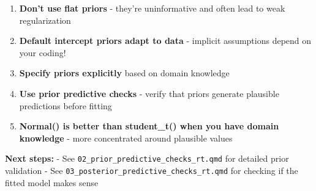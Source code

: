\documentclass[
  11pt,
]{article}
\providecommand{\tightlist}{%
  \setlength{\itemsep}{0pt}\setlength{\parskip}{0pt}}
\begin{document}
\begin{enumerate}
\def\labelenumi{\arabic{enumi}.}
\tightlist
\item
  \textbf{Don't use flat priors} - they're uninformative and often lead
  to weak regularization
\item
  \textbf{Default intercept priors adapt to data} - implicit assumptions
  depend on your coding!
\item
  \textbf{Specify priors explicitly} based on domain knowledge
\item
  \textbf{Use prior predictive checks} - verify that priors generate
  plausible predictions before fitting
\item
  \textbf{Normal() is better than student\_t() when you have domain
  knowledge} - more concentrated around plausible values
\end{enumerate}

\textbf{Next steps:} - See
\texttt{02\_prior\_predictive\_checks\_rt.qmd} for detailed prior
validation - See \texttt{03\_posterior\_predictive\_checks\_rt.qmd} for
checking if the fitted model makes sense
\end{document}

